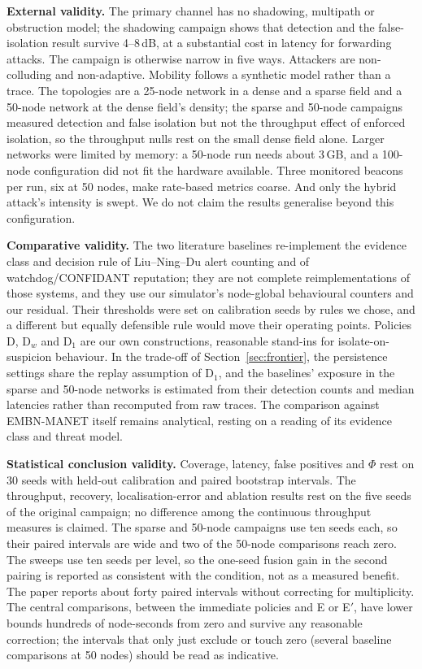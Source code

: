 \textbf{External validity.} The primary channel has no shadowing, multipath or
obstruction model; the shadowing campaign shows that detection and the
false-isolation result survive 4--8\,dB, at a substantial cost in latency for
forwarding attacks. The campaign is otherwise narrow in five ways. Attackers
are non-colluding and non-adaptive. Mobility follows a synthetic model rather
than a trace. The topologies are a 25-node network in a dense and a sparse
field and a 50-node network at the dense field's density; the sparse and
50-node campaigns measured detection and false isolation but not the
throughput effect of enforced isolation, so the throughput nulls rest on the
small dense field alone. Larger networks were limited by memory: a 50-node
run needs about 3\,GB, and a 100-node configuration did not fit the hardware
available. Three monitored beacons per run, six at 50 nodes, make rate-based
metrics coarse. And
only the hybrid attack's intensity is swept. We do not claim the results
generalise beyond this configuration.

\textbf{Comparative validity.} The two literature baselines re-implement
the evidence class and decision rule of Liu--Ning--Du alert counting and of
watchdog/CONFIDANT reputation; they are not complete reimplementations of
those systems, and they use our simulator's node-global behavioural counters
and our residual. Their thresholds were set on calibration seeds by rules we
chose, and a different but equally defensible rule would move their operating
points. Policies D, D$_w$ and D$_1$ are our own constructions, reasonable
stand-ins for isolate-on-suspicion behaviour. In the trade-off of
Section~\ref{sec:frontier}, the persistence settings share the replay
assumption of D$_1$, and the baselines' exposure in the sparse and 50-node
networks is estimated from their detection counts and median latencies rather
than recomputed from raw traces. The comparison against
EMBN-MANET itself remains analytical, resting on a reading of its evidence
class and threat model.

\textbf{Statistical conclusion validity.} Coverage, latency, false positives
and $\Phi$ rest on 30 seeds with held-out calibration and paired bootstrap
intervals. The throughput, recovery, localisation-error and ablation results
rest on the five seeds of the original campaign; no difference among the
continuous throughput measures is claimed. The sparse and 50-node campaigns use ten seeds each, so their paired
intervals are wide and two of the 50-node comparisons reach zero. The sweeps
use ten seeds per level,
so the one-seed fusion gain in the second pairing is reported as consistent
with the condition, not as a measured benefit. The paper reports about forty
paired intervals without correcting for multiplicity. The central comparisons,
between the immediate policies and E or E$'$, have lower bounds hundreds of
node-seconds from zero and survive any reasonable correction; the intervals
that only just exclude or touch zero (several baseline comparisons at 50
nodes) should be read as indicative.

